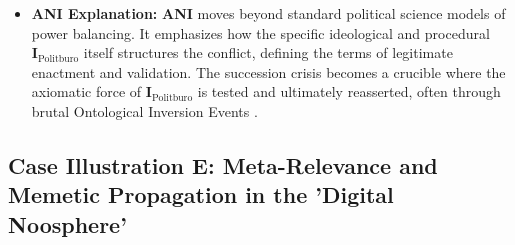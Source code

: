 \documentclass{article}
\newcommand{\ANI}{\textbf{ANI}}             %
\newcommand{\Isness}{\mathbf{I}}            %
\begin{document}
\begin{itemize}
    \item \textbf{ANI Explanation:} \ANI{} moves beyond standard political science models of power balancing. It emphasizes how the specific ideological and procedural $\Isness_{\text{Politburo}}$ itself structures the conflict, defining the terms of legitimate enactment and validation. The succession crisis becomes a crucible where the axiomatic force of $\Isness_{\text{Politburo}}$ is tested and ultimately reasserted, often through brutal Ontological Inversion Events \citep{Arendt1951}.
\end{itemize}

\subsection{Case Illustration E: Meta-Relevance and Memetic Propagation in the 'Digital Noosphere'}
\end{document}
